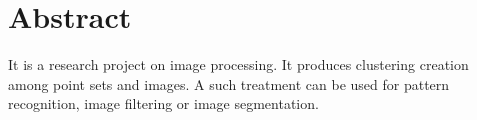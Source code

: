 \documentclass[12pt]{article} %
\begin{document}
\begin{titlepage}

\vfill %

\begin{figure}[H] %
\label{fig:speciation}
\end{figure}

\end{titlepage}


\tableofcontents %

\newpage %


\section{Abstract} %
It is a research project on image processing. It produces clustering creation among point sets and images.
A such treatment can be used for pattern recognition, image filtering or image segmentation.
\end{document}
